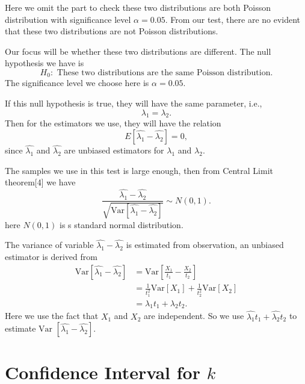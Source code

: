 \documentclass[11pt,a4paper,english]{article}
\begin{document}
Here we omit the part to check these two distributions are both Poisson distribution with significance level $\alpha = 0.05$. From our test, there are no evident that these two distributions are not Poisson distributions.

Our focus will be whether these two distributions are different. The null hypothesis we have is 
\begin{equation*}
	H_{0}:\text{ These two distributions are the same Poisson distribution.}
\end{equation*}
The significance level we choose here is $\alpha = 0.05$.

If this null hypothesis is true, they will have the same parameter, i.e.,
\begin{equation*}
	\lambda_{1} = \lambda_{2}.
\end{equation*}
Then for the estimators we use, they will have the relation
\begin{equation*}
	E[\hat{\lambda_{1}}-\hat{\lambda_{2}}] = 0,
\end{equation*}
since $\hat{\lambda_{1}}$ and $\hat{\lambda_{2}}$ are unbiased estimators for $\lambda_{1}$ and $\lambda_{2}$.

The samples we use in this test is large enough, then from Central Limit theorem[4] we have
\begin{equation*}
	\frac{\hat{\lambda_{1}} - \hat{\lambda_{2}}}{\sqrt{\text{Var}\left[\hat{\lambda_{1}} - \hat{\lambda_{2}}\right]}}
	\sim N(0, 1).
\end{equation*}
here $N(0,1)$ is s standard normal distribution.

The variance of variable $\hat{\lambda_{1}}-\hat{\lambda_{2}}$ is estimated from observation, an unbiased estimator is derived from
\begin{align*}
	\text{Var}\left[\hat{\lambda_{1}} - \hat{\lambda_{2}}\right]
	&= \text{Var}\left[\frac{X_{1}}{t_{1}} - \frac{X_{2}}{t_{2}}\right] \\
	&= \frac{1}{t_{1}^{2}}\text{Var}[X_{1}]
	+ \frac{1}{t_{2}^{2}}\text{Var}[X_{2}] \\
	&= \lambda_{1} t_{1} + \lambda_{2} t_{2}.
\end{align*}
Here we use the fact that $X_{1}$ and $X_{2}$ are independent. So we use $\hat{\lambda_{1}}t_{1}+\hat{\lambda_{2}}t_{2}$ to estimate $\text{Var }\left[\hat{\lambda_{1}}-\hat{\lambda_{2}}\right]$.

\section{Confidence Interval for $k$}
\end{document}
